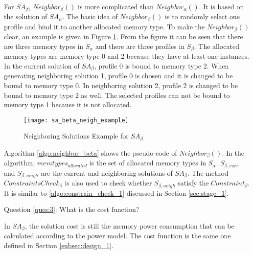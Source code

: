 		For $SA_{\beta}$, $Neighbor_{\beta}()$ is more complicated than
		$Neighbor_{\alpha}()$. It is based on the solution of $SA_{\alpha}$.
		The basic idea of $Neighbor_{\beta}()$ is to randomly select one profile
		and bind it to another allocated memory type.
		To make the $Neighbor_{\beta}()$ clear, an example is given in
		Figure \ref{fig:sa_beta_neigh_example}.
		From the figure it can be seen that there are three
		memory types in $S_{\alpha}$ and there are three profiles in $S_{\beta}$.
		The allocated memory types are memory type 0 and 2 because they have at least one instances.
		In the current solution of $SA_{\beta}$, profile 0 is bound to
		memory type 2.
		When generating neighboring solution 1, profile 0 is chosen and it is changed to
		be bound to memory type 0.
		In neighboring solution 2, profile 2 is changed to be bound to memory type 2
		as well.
		The selected profiles can not be bound to memory type 1 because it is not allocated.
		\begin{figure}[h]
			\begin{center}
				\texttt{[image: sa\_beta\_neigh\_example]}
				\caption{Neighboring Solutions Example for $SA_{\beta}$}
				\label{fig:sa_beta_neigh_example}
			\end{center}
		\end{figure}		
	
		Algorithm \ref{algo:neighbor_beta} shows the pseudo-code of $Neighbor_{\beta}()$.
		In the algorithm, $memtypes_{allocated}$ is the set of allocated memory types in $S_{\alpha}$.
		$S_{\beta,curr}$ and $S_{\beta,neigh}$ are the current and neighboring solutions
		of $SA_{\beta}$.
		The method $ConstraintsCheck_{\beta}$ is also used to check whether
		$S_{\beta,neigh}$ satisfy the $Constraint_{\beta}$. It is similar to \ref{algo:constrain_check_1} discussed in Section \ref{sec:stage_1}.
		
	
		Question \ref{ques:3}: What is the cost function?
	
		In $SA_{\beta}$, the solution cost is still the memory power consumption
		that can be calculated according to the power model. The cost function is
		the same one defined in Section \ref{subsec:design_1}.
		
